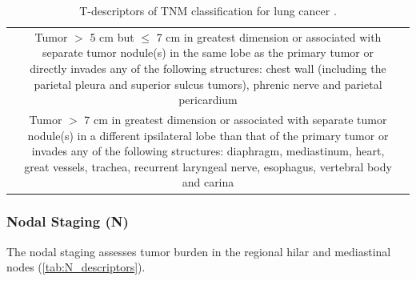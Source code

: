 \begin{table}[ht]
{\begin{tabular}{lcp{18cm}}
\rowcolor[HTML]{FFFFFF} 
    \multicolumn{2}{l}{\cellcolor[HTML]{FFFFFF}\textbf{T3}} & Tumor $>$ 5 cm but $\le$ 7 cm in greatest dimension or associated with separate tumor nodule(s) in the same lobe as the primary tumor or directly invades any of the following structures: chest wall (including the parietal pleura and superior sulcus tumors), phrenic nerve and parietal pericardium \\
\rowcolor[HTML]{EFEFEF}
    \multicolumn{2}{l}{\cellcolor[HTML]{EFEFEF}\textbf{T4}} & Tumor $>$ 7 cm in greatest dimension or associated with separate tumor nodule(s) in a different ipsilateral lobe than that of the primary tumor or invades any of the following structures: diaphragm, mediastinum, heart, great vessels, trachea, recurrent laryngeal nerve, esophagus, vertebral body and carina
\end{tabular}}
\caption{T-descriptors of TNM classification for lung cancer \cite{TNM_proposal}.}
\label{tab:T_descriptors}
\end{table}

\subsubsection{Nodal Staging (N)}

The nodal staging assesses tumor burden in the regional hilar and mediastinal nodes (\autoref{tab:N_descriptors}).

\begin{table}[ht]
\centering
{}
\caption{N-descriptors of TNM classification for lung cancer \cite{TNM_proposal}.}
\label{tab:N_descriptors}
\end{table}

